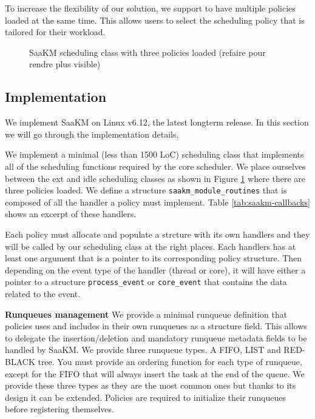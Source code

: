 \par To increase the flexibility of our solution, we support to have multiple policies loaded at the same time. This allows users to select the scheduling policy that is tailored for their workload.

\begin{figure}[htbp]
        \centering
        
        \caption{SaaKM scheduling class with three policies loaded (refaire pour rendre plus visible)}
        \label{fig:linux-saakm-sched-class}
\end{figure}

\subsection{Implementation}
\par We implement SaaKM on Linux v6.12, the latest longterm release. In this section we will go through the implementation details.

\par We implement a minimal (less than 1500 LoC) scheduling class that implements all of the scheduling functions required by the core scheduler. We place ourselves between the ext and idle scheduling classes as shown in Figure \ref{fig:linux-saakm-sched-class} where there are three policies loaded. We define a structure \texttt{saakm\_module\_routines} that is composed of all the handler a policy must implement. Table \ref{tab:saakm-callbacks} shows an excerpt of these handlers.

\par Each policy must allocate and populate a strcture with its own handlers and they will be called by our scheduling class at the right places. Each handlers has at least one argument that is a pointer to its corresponding policy structure. Then depending on the event type of the handler (thread or core), it will have either a pointer to a structure \texttt{process\_event} or \texttt{core\_event} that contains the data related to the event.\newline

\par \textbf{Runqueues management} We provide a minimal runqueue definition that policies uses and includes in their own runqueues as a structure field. This allows to delegate the insertion/deletion and mandatory runqueue metadata fields to be handled by SaaKM. We provide three runqueue types. A FIFO, LIST and RED-BLACK tree. You must provide an ordering function for each type of runqueue, except for the FIFO that will always insert the task at the end of the queue. We provide these three types as they are the most common ones but thanks to its design it can be extended. Policies are required to initialize their runqueues before registering themselves.\newline 

